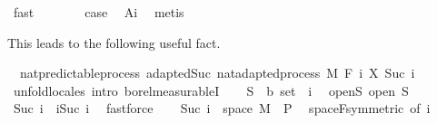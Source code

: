 \begin{isabellebody}
\ fast\isanewline
\ \ \ \ \isamarkupfalse%
\ \isamarkupfalse%
\ {\isacharquery}{\kern0pt}case\ \isamarkupfalse%
\ A{\isacharunderscore}{\kern0pt}i\ \isamarkupfalse%
\ metis\isanewline
\ \ \isacommand{{\isacharbraceright}{\kern0pt}}\isamarkupfalse%
\isanewline
{}\isamarkupfalse%
%
\endisatagproof
{\isafoldproof}%
%
\isadelimproof
%
\endisadelimproof
%
\begin{isamarkuptext}%
This leads to the following useful fact.%
\end{isamarkuptext}\isamarkuptrue%
\isamarkupfalse%
\ {\isacharparenleft}{\kern0pt}\ nat{\isacharunderscore}{\kern0pt}predictable{\isacharunderscore}{\kern0pt}process{\isacharparenright}{\kern0pt}\ adapted{\isacharunderscore}{\kern0pt}Suc{\isacharcolon}{\kern0pt}\ {\isachardoublequoteopen}nat{\isacharunderscore}{\kern0pt}adapted{\isacharunderscore}{\kern0pt}process\ M\ F\ {\isacharparenleft}{\kern0pt}{\isasymlambda}i{\isachardot}{\kern0pt}\ X\ {\isacharparenleft}{\kern0pt}Suc\ i{\isacharparenright}{\kern0pt}{\isacharparenright}{\kern0pt}{\isachardoublequoteclose}\isanewline
%
\isadelimproof
%
\endisadelimproof
%
\isatagproof
{}\isamarkupfalse%
\ {\isacharparenleft}{\kern0pt}unfold{\isacharunderscore}{\kern0pt}locales{\isacharcomma}{\kern0pt}\ intro\ borel{\isacharunderscore}{\kern0pt}measurableI{\isacharparenright}{\kern0pt}\isanewline
\ \ \isamarkupfalse%
\ S\ {\isacharcolon}{\kern0pt}{\isacharcolon}{\kern0pt}\ {\isachardoublequoteopen}{\isacharprime}{\kern0pt}b\ set{\isachardoublequoteclose}\ \ i\ \isamarkupfalse%
\ open{\isacharunderscore}{\kern0pt}S{\isacharcolon}{\kern0pt}\ {\isachardoublequoteopen}open\ S{\isachardoublequoteclose}\isanewline
\ \ \isamarkupfalse%
\ {\isachardoublequoteopen}{\isacharbraceleft}{\kern0pt}Suc\ i{\isacharbraceright}{\kern0pt}\ {\isacharequal}{\kern0pt}\ {\isacharbraceleft}{\kern0pt}i{\isacharless}{\kern0pt}{\isachardot}{\kern0pt}{\isachardot}{\kern0pt}Suc\ i{\isacharbraceright}{\kern0pt}{\isachardoublequoteclose}\ \isamarkupfalse%
\ fastforce\isanewline
\ \ \isamarkupfalse%
\ {\isachardoublequoteopen}{\isacharbraceleft}{\kern0pt}Suc\ i{\isacharbraceright}{\kern0pt}\ {\isasymtimes}\ space\ M\ {\isasymin}\ {\isasymSigma}\isactrlsub P{\isachardoublequoteclose}\ \isamarkupfalse%
\ space{\isacharunderscore}{\kern0pt}F{\isacharbrackleft}{\kern0pt}symmetric{\isacharcomma}{\kern0pt}\ of\ i{\isacharbrackright}{\kern0pt}\ \isamarkupfalse%

\end{isabellebody}
